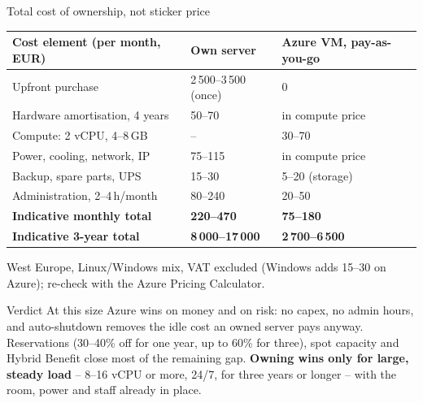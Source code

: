 \documentclass[aspectratio=169,xcolor=dvipsnames]{beamer}
\begin{document}
	\begin{frame}[shrink=15]{Total cost of ownership, not sticker price}
		\centering
		\renewcommand{\arraystretch}{1.2}
		\setlength{\tabcolsep}{4pt}
		\footnotesize
		
		\begin{tabular}{@{} L{4.9cm} L{2.9cm} L{3.2cm} @{}}
			\toprule
			\textbf{Cost element (per month, EUR)} & \textbf{Own server} & \textbf{Azure VM, pay-as-you-go} \\
			\midrule
			Upfront purchase & 2\,500--3\,500 (once) & 0 \\
			Hardware amortisation, 4 years & 50--70 & in compute price \\
			Compute: 2 vCPU, 4--8\,GB & -- & 30--70 \\
			Power, cooling, network, IP & 75--115 & in compute price \\
			Backup, spare parts, UPS & 15--30 & 5--20 (storage) \\
			Administration, 2--4\,h/month & 80--240 & 20--50 \\
			\midrule
			\textbf{Indicative monthly total} & \textbf{220--470} & \textbf{75--180} \\
			\textbf{Indicative 3-year total} & \textbf{8\,000--17\,000} & \textbf{2\,700--6\,500} \\
			\bottomrule
		\end{tabular}
		
		\vspace{0.15cm}
		{\scriptsize West Europe, Linux/Windows mix, VAT excluded (Windows adds 15--30 on Azure); re-check with the Azure Pricing Calculator.}
		
		\vspace{0.15cm}
		\begin{block}{Verdict}
			{\footnotesize
				At this size Azure wins on money and on risk: no capex, no admin hours, and auto-shutdown removes the idle cost an owned server pays anyway. Reservations (30--40\% off for one year, up to 60\% for three), spot capacity and Hybrid Benefit close most of the remaining gap. \textbf{Owning wins only for large, steady load} -- 8--16 vCPU or more, 24/7, for three years or longer -- with the room, power and staff already in place.}
		\end{block}
	\end{frame}
\end{document}
